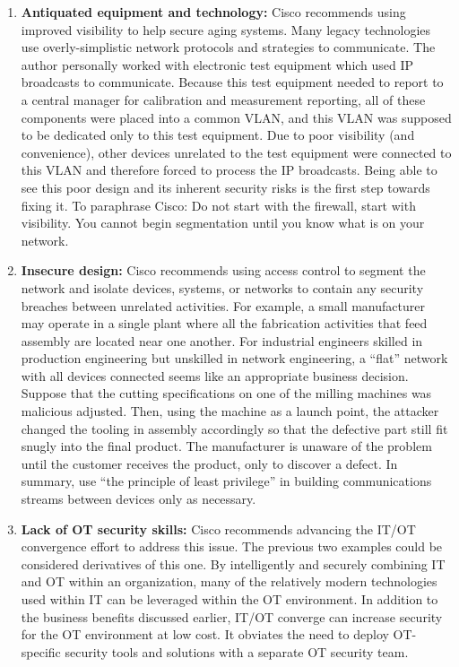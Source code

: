 \begin{enumerate}
  \item	\textbf{Antiquated equipment and technology:} Cisco recommends using
  improved visibility to help secure aging systems. Many legacy technologies use
  overly-simplistic network protocols and strategies to communicate. The
  author personally worked with electronic test equipment which used IP
  broadcasts to communicate. Because this test equipment needed to report to a
  central manager for calibration and measurement reporting, all of these
  components were placed into a common VLAN, and this VLAN was supposed to be
  dedicated only to this test equipment. Due to poor visibility (and
  convenience), other devices unrelated to the test equipment were connected
  to this VLAN and therefore forced to process the IP broadcasts. Being able
  to see this poor design and its inherent security risks is the first step
  towards fixing it. To paraphrase Cisco: Do not start with the firewall,
  start with visibility. You cannot begin segmentation until you know what is
  on your network.
  \item	\textbf{Insecure design:} Cisco recommends using access control to
  segment the network and isolate devices, systems, or networks to contain any
  security breaches between unrelated activities. For example, a small
  manufacturer may operate in a single plant where all the fabrication
  activities that feed assembly are located near one another. For industrial
  engineers skilled in production engineering but unskilled in network
  engineering, a ``flat'' network with all devices connected seems like an
  appropriate business decision. Suppose that the cutting specifications on
  one of the milling machines was malicious adjusted. Then, using the machine
  as a launch point, the attacker changed the tooling in assembly accordingly
  so that the defective part still fit snugly into the final product. The
  manufacturer is unaware of the problem until the customer receives the
  product, only to discover a defect. In summary, use ``the principle of least
  privilege'' in building communications streams between devices only as necessary.
  \item	\textbf{Lack of OT security skills:} Cisco recommends advancing the IT/OT
  convergence effort to address this issue. The previous two examples could be
  considered derivatives of this one. By intelligently and securely combining
  IT and OT within an organization, many of the relatively modern technologies
  used within IT can be leveraged within the OT environment. In addition to
  the business benefits discussed earlier, IT/OT converge can increase
  security for the OT environment at low cost. It obviates the need to deploy
  OT-specific security tools and solutions with a separate OT security team.
\end{enumerate}

